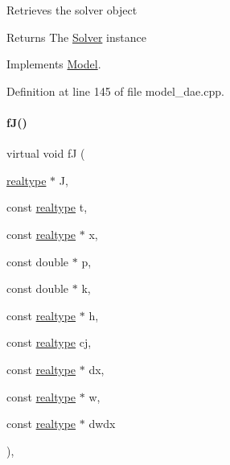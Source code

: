 Retrieves the solver object \begin{DoxyReturn}{Returns}
The \mbox{\hyperlink{classamici_1_1_solver}{Solver}} instance 
\end{DoxyReturn}


Implements \mbox{\hyperlink{classamici_1_1_model_a61d5b19b2e4d5ffcc73a014d59494344}{Model}}.



Definition at line 145 of file model\+\_\+dae.\+cpp.

\mbox{\label{classamici_1_1_model___d_a_e_a81b48d60fb3d3d5cc8d27bf95311ac7d}} 
\paragraph{\texorpdfstring{f\+J()}{fJ()}\hspace{0.1cm}{\footnotesize\ttfamily [3/3]}}
{\footnotesize\ttfamily virtual void fJ (\begin{DoxyParamCaption}\item[{\mbox{\hyperlink{namespaceamici_a1bdce28051d6a53868f7ccbf5f2c14a3}{realtype}} $\ast$}]{J,  }\item[{const \mbox{\hyperlink{namespaceamici_a1bdce28051d6a53868f7ccbf5f2c14a3}{realtype}}}]{t,  }\item[{const \mbox{\hyperlink{namespaceamici_a1bdce28051d6a53868f7ccbf5f2c14a3}{realtype}} $\ast$}]{x,  }\item[{const double $\ast$}]{p,  }\item[{const double $\ast$}]{k,  }\item[{const \mbox{\hyperlink{namespaceamici_a1bdce28051d6a53868f7ccbf5f2c14a3}{realtype}} $\ast$}]{h,  }\item[{const \mbox{\hyperlink{namespaceamici_a1bdce28051d6a53868f7ccbf5f2c14a3}{realtype}}}]{cj,  }\item[{const \mbox{\hyperlink{namespaceamici_a1bdce28051d6a53868f7ccbf5f2c14a3}{realtype}} $\ast$}]{dx,  }\item[{const \mbox{\hyperlink{namespaceamici_a1bdce28051d6a53868f7ccbf5f2c14a3}{realtype}} $\ast$}]{w,  }\item[{const \mbox{\hyperlink{namespaceamici_a1bdce28051d6a53868f7ccbf5f2c14a3}{realtype}} $\ast$}]{dwdx }\end{DoxyParamCaption})\hspace{0.3cm}{\ttfamily [protected]}, {}}


